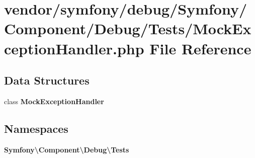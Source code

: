 \section{vendor/symfony/debug/\+Symfony/\+Component/\+Debug/\+Tests/\+Mock\+Exception\+Handler.php File Reference}
\label{_mock_exception_handler_8php}
\subsection*{Data Structures}
\begin{DoxyCompactItemize}
\item 
class {\bf Mock\+Exception\+Handler}
\end{DoxyCompactItemize}
\subsection*{Namespaces}
\begin{DoxyCompactItemize}
\item 
 {\bf Symfony\textbackslash{}\+Component\textbackslash{}\+Debug\textbackslash{}\+Tests}
\end{DoxyCompactItemize}
